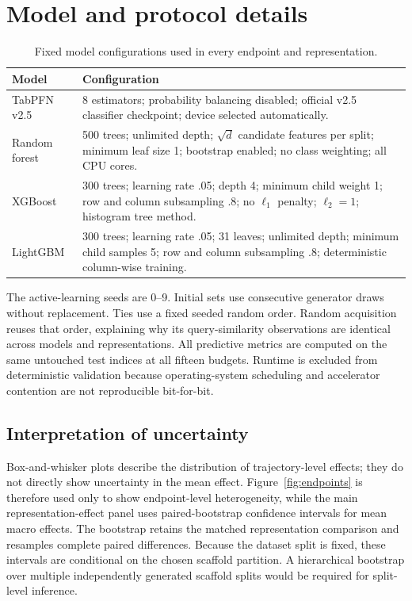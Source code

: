 \documentclass[twoside,11pt]{article}
\begin{document}
\section{Model and protocol details}\label{app:hyper}
\begin{table}[h]
\centering
\small
\caption{Fixed model configurations used in every endpoint and representation.}
\begin{tabular}{p{}p{}}
\toprule
Model & Configuration \\
\midrule
TabPFN v2.5 & 8 estimators; probability balancing disabled; official v2.5 classifier checkpoint; device selected automatically. \\
Random forest & 500 trees; unlimited depth; $\sqrt{d}$ candidate features per split; minimum leaf size 1; bootstrap enabled; no class weighting; all CPU cores. \\
XGBoost & 300 trees; learning rate .05; depth 4; minimum child weight 1; row and column subsampling .8; no $\ell_1$ penalty; $\ell_2=1$; histogram tree method. \\
LightGBM & 300 trees; learning rate .05; 31 leaves; unlimited depth; minimum child samples 5; row and column subsampling .8; deterministic column-wise training. \\
\bottomrule
\end{tabular}
\end{table}

The active-learning seeds are 0--9. Initial sets use consecutive generator draws without replacement. Ties use a fixed seeded random order. Random acquisition reuses that order, explaining why its query-similarity observations are identical across models and representations. All predictive metrics are computed on the same untouched test indices at all fifteen budgets. Runtime is excluded from deterministic validation because operating-system scheduling and accelerator contention are not reproducible bit-for-bit.

\subsection{Interpretation of uncertainty}
Box-and-whisker plots describe the distribution of trajectory-level effects; they do not directly show uncertainty in the mean effect. Figure~\ref{fig:endpoints} is therefore used only to show endpoint-level heterogeneity, while the main representation-effect panel uses paired-bootstrap confidence intervals for mean macro effects. The bootstrap retains the matched representation comparison and resamples complete paired differences. Because the dataset split is fixed, these intervals are conditional on the chosen scaffold partition. A hierarchical bootstrap over multiple independently generated scaffold splits would be required for split-level inference.
\end{document}
